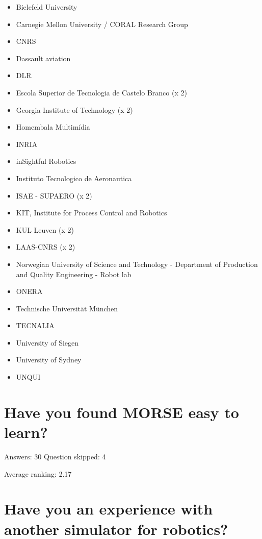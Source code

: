 \documentclass{article}
\newcommand{\answer}[1]{Answers: #1}
\newcommand{\skipped}[1]{Question skipped: #1}
\newcommand{\barcolor}{green!60!blue}
\begin{document}
\begin{itemize}
	\item Bielefeld University
	\item Carnegie Mellon University / CORAL Research Group
	\item CNRS
	\item Dassault aviation
	\item DLR
	\item Escola Superior de Tecnologia de Castelo Branco (x 2)
	\item Georgia Institute of Technology (x 2)
	\item Homembala Multimídia
	\item INRIA
	\item inSightful Robotics
	\item Instituto Tecnologico de Aeronautica
	\item ISAE - SUPAERO (x 2)
	\item KIT, Institute for Process Control and Robotics
	\item KUL Leuven (x 2)
	\item LAAS-CNRS (x 2)
    \item Norwegian University of Science and Technology - Department of Production and Quality Engineering - Robot lab
	\item ONERA
	\item Technische Universität München
	\item TECNALIA
	\item University of Siegen
	\item University of Sydney
	\item UNQUI
\end{itemize}

\section{Have you found MORSE easy to learn?}

\answer{30}
\skipped{4}

\begin{bchart}[max=30]
\bcbar[label=1 - Easy (3.3\%),color=\barcolor]{1}
\bcbar[label=2 - Reasonably easy (76.7\%),color=\barcolor]{23}
\bcbar[label=3 - Hard (20\%),color=\barcolor]{6}
\bcbar[label=4- Very hard (0.0\%),color=\barcolor]{0}
\end{bchart}

Average ranking: 2.17

\section{Have you an experience with another simulator for robotics?}
\end{document}
